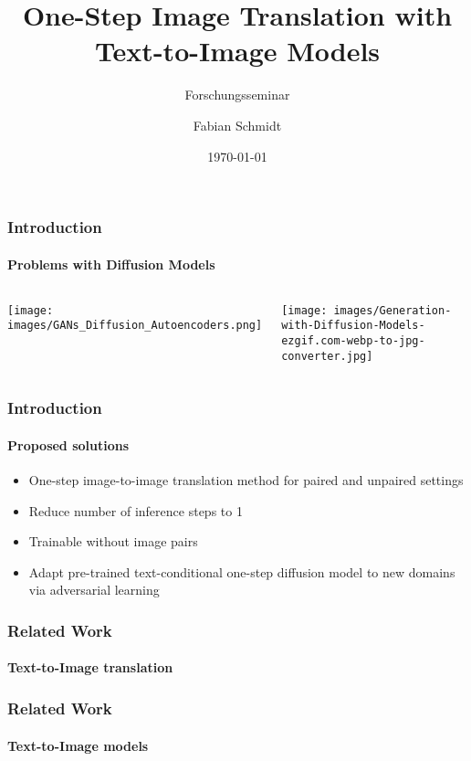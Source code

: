 \documentclass[aspectratio=169, lecture, amberg]{OTHAWbeamer}
\title[Forschungsseminar]{One-Step Image Translation with Text-to-Image Models}
\subtitle{Forschungsseminar}
\author[Schmidt]{Fabian Schmidt}
\date{\today}
\begin{document}
\maketitle


\begin{frame}
\frametitle{Introduction}
\framesubtitle{Problems with Diffusion Models}

\begin{columns}
    \centering
    \texttt{[image: images/GANs\_Diffusion\_Autoencoders.png]}

    \centering
    \texttt{[image: images/Generation-with-Diffusion-Models-ezgif.com-webp-to-jpg-converter.jpg]}
  \end{columns}
\end{frame}


\begin{frame}
\frametitle{Introduction}
\framesubtitle{Proposed solutions}
\begin{itemize}
    \item One-step image-to-image translation method for paired and unpaired settings
    \item Reduce number of inference steps to 1
    \item Trainable without image pairs
    \item Adapt pre-trained text-conditional one-step diffusion model to new domains via adversarial learning
\end{itemize}
\end{frame}

\begin{frame}
\frametitle{Related Work}
\framesubtitle{Text-to-Image translation}

\end{frame}

\begin{frame}
\frametitle{Related Work}
\framesubtitle{Text-to-Image models}

\end{frame}
\end{document}
